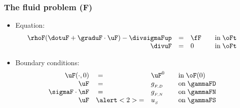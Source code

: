 \begin{frame}
  \frametitle{The fluid problem (F)}

  \linespread{1.5}
  \begin{itemize}
  \item
    Equation:
    \begin{equation*}
      \begin{array}{rlll}
        \rhoF(\dotuF + \graduF \cdot \uF) - \divsigmaFup & = & \fF &\quad \textrm{in}\;
        \oFt\\
        \divuF & =& 0 &\quad  \textrm{in}\;\oFt
      \end{array}
    \end{equation*}
  \item
    Boundary conditions:
    \begin{equation*}
      \begin{array}{rlll}
        \uF (\cdot, 0) &\;=&  \uF ^{{0}} & \quad \textrm{in}\;
        \oF(0)\\
        \uF &\;=& g_{_{F,D}} & \quad \textrm{on}\;\gammaFD\\
        \sigmaF \cdot \nF &\;=& g_{_{F,N}}  &\quad\textrm{on}\;\gammaFN\\
        \uF &\alert<2>{=}& u_{_{S}} &\quad \textrm{on}\;\gammaFS\\
      \end{array}
    \end{equation*}
  \end{itemize}
  \linespread{1.0}

\end{frame}
